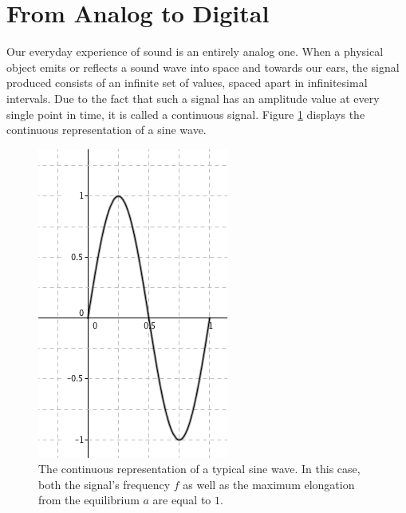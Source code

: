 \documentclass[12pt,twoside]{report}
\begin{document}
\section{From Analog to Digital}

Our everyday experience of sound is an entirely analog one. When a physical     object emits or reflects a sound wave into space and towards our ears, the signal produced consists of an infinite set of values, spaced apart in infinitesimal intervals. Due to the fact that such a signal has an amplitude value at every single point in time, it is called a continuous signal.  Figure \ref{fig:cont} displays the continuous representation of a sine wave.

\begin{figure}[h!]

  \centering

  \includegraphics[scale=0.5]{img/cont}

  \caption{The continuous representation of a typical sine wave. In this case, both the signal's frequency $f$ as well as the maximum elongation from the equilibrium $a$ are equal to $1$. }

  \label{fig:cont}

\end{figure}

\pagebreak
\end{document}
